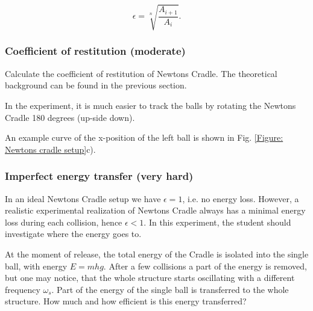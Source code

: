 \documentclass{article}
\begin{document}
\begin{equation}
    \epsilon = \sqrt[n]{\frac{A_{i+1}}{A_i}}.
\end{equation}

\subsubsection{Coefficient of restitution (moderate)}
Calculate the coefficient of restitution of Newtons Cradle. The theoretical background can be found in the previous section.

In the experiment, it is much easier to track the balls by rotating the Newtons Cradle 180 degrees (up-side down). 

An example curve of the x-position of the left ball is shown in Fig. \ref{Figure: Newtons cradle setup}c). 

\subsubsection{Imperfect energy transfer (very hard)}
In an ideal Newtons Cradle setup we have $\epsilon = 1$, i.e. no energy loss. However, a realistic experimental realization of Newtons Cradle always has a minimal energy loss during each collision, hence $\epsilon<1$. In this experiment, the student should investigate where the energy goes to. 

At the moment of release, the total energy of the Cradle is isolated into the single ball, with energy $E=mhg$. After a few collisions a part of the energy is removed, but one may notice, that the whole structure starts oscillating with a different frequency $\omega_s$. Part of the energy of the single ball is transferred to the whole structure. How much and how efficient is this energy transferred?
\end{document}
